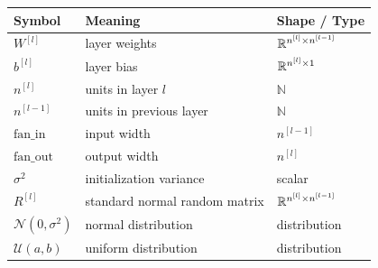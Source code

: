 \begin{center}
\begin{tabular}{lll}
\toprule
Symbol & Meaning & Shape / Type \\
\midrule
$W^{[l]}$ & layer weights & $\mathbb{R}^{n^{[l]} \times n^{[l-1]}}$ \\
$b^{[l]}$ & layer bias & $\mathbb{R}^{n^{[l]} \times 1}$ \\
$n^{[l]}$ & units in layer $l$ & $\mathbb{N}$ \\
$n^{[l-1]}$ & units in previous layer & $\mathbb{N}$ \\
$\mathrm{fan\_in}$ & input width & $n^{[l-1]}$ \\
$\mathrm{fan\_out}$ & output width & $n^{[l]}$ \\
$\sigma^2$ & initialization variance & scalar \\
$R^{[l]}$ & standard normal random matrix & $\mathbb{R}^{n^{[l]} \times n^{[l-1]}}$ \\
$\mathcal{N}(0,\sigma^2)$ & normal distribution & distribution \\
$\mathcal{U}(a,b)$ & uniform distribution & distribution \\
\bottomrule
\end{tabular}
\end{center}
